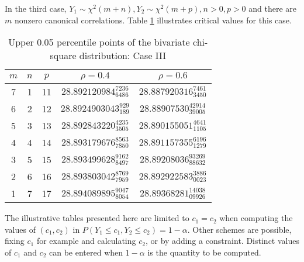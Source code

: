 In the third case, $Y_1 \sim \chi^2(m+n), Y_2 \sim \chi^2(m+p), n > 0,p > 0$ 
and there are $m$ nonzero canonical correlations.  Table \ref{case3:05}
illustrates critical values for this case.
\begin{table}[ht]
\caption{Upper 0.05 percentile points of the bivariate chi-square distribution:
Case III}
\label{case3:05}
\begin{center}
\begin{tabular}{c|c|c|c|c}
$m$ & $n$  & $p$ & $\rho=0.4$ & $\rho=0.6$ \\ \hline
7   & 1      & 11    & $28.892120984_{6486}^{7236} $ & $28.887920316_{3450}^{7461} $ \\
6   & 2      & 12    & $28.8924903043_{189}^{929}  $ & $28.88907530_{39005}^{42914} $ \\
5   & 3      & 13    & $28.892843220_{3505}^{4235} $ & $28.890155051_{1105}^{4641} $ \\
4   & 4      & 14    & $28.893179676_{7850}^{8563} $ & $28.891157355_{1279}^{6196} $ \\
3   & 5      & 15    & $28.893499628_{8497}^{9162} $ & $28.89208036_{88632}^{93269} $ \\
2   & 6      & 16    & $28.893803042_{7959}^{8769} $ & $28.892922583_{0023}^{3886} $ \\
1   & 7      & 17    & $28.894089895_{8054}^{9047} $ & $28.89368281_{09926}^{14038} $ \\
\end{tabular}
\end{center}
\end{table}
\renewcommand{\arraystretch}{1.00}

The illustrative tables presented here are limited to $c_1 = c_2$ when
computing the values of $(c_1, c_2)$ in $P(Y_1 \leq c_1, Y_2 \leq c_2) =
1-\alpha$.  Other schemes are possible, fixing $c_1$ for example and 
calculating $c_2$, or by adding a constraint.  Distinct values of $c_1$ and $c_2$ can be entered when
$1-\alpha$ is the quantity to be computed.


